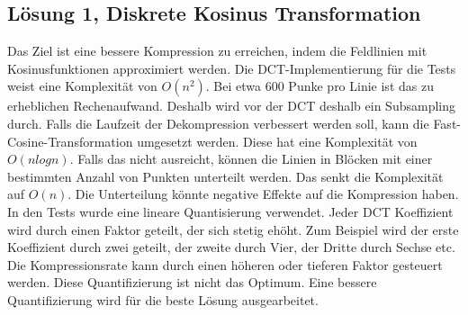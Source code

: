 \subsection{Lösung 1, Diskrete Kosinus Transformation}
Das Ziel ist eine bessere Kompression zu erreichen, indem die Feldlinien mit Kosinusfunktionen approximiert werden. 
Die DCT-Implementierung für die Tests weist eine Komplexität von $O(n^2)$. Bei etwa $600$ Punke pro Linie ist das zu erheblichen Rechenaufwand. Deshalb wird vor der DCT deshalb ein Subsampling durch. Falls die Laufzeit der Dekompression verbessert werden soll, kann die Fast-Cosine-Transformation umgesetzt werden. Diese hat eine Komplexität von $O(n logn)$. Falls das nicht ausreicht, können die Linien in Blöcken mit einer bestimmten Anzahl von Punkten unterteilt werden. Das senkt die Komplexität auf $O(n)$. Die Unterteilung könnte negative Effekte auf die Kompression haben.\\
[\baselineskip]
In den Tests wurde eine lineare Quantisierung verwendet. Jeder DCT Koeffizient wird durch einen Faktor geteilt, der sich stetig ehöht. Zum Beispiel wird der erste Koeffizient durch zwei geteilt, der zweite durch Vier, der Dritte durch Sechse etc.  Die Kompressionsrate kann durch einen höheren oder tieferen Faktor gesteuert werden. Diese Quantifizierung ist nicht das Optimum. Eine bessere Quantifizierung wird für die beste Lösung ausgearbeitet.

